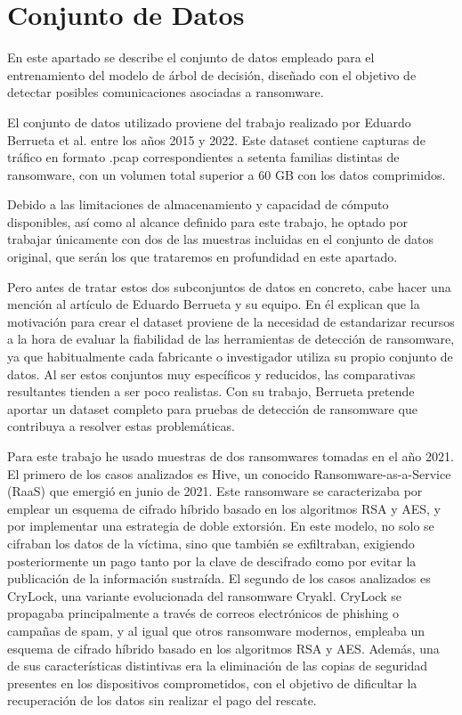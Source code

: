 \section{Conjunto de Datos}
En este apartado se describe el conjunto de datos empleado para el entrenamiento del modelo de árbol de decisión, diseñado con el objetivo de detectar posibles comunicaciones asociadas a ransomware.

El conjunto de datos utilizado proviene del trabajo realizado por Eduardo Berrueta et al. entre los años 2015 y 2022\cite{qnyn-q136-20}. Este dataset contiene capturas de tráfico en formato .pcap correspondientes a setenta familias distintas de ransomware, con un volumen total superior a 60 GB con los datos comprimidos.

Debido a las limitaciones de almacenamiento y capacidad de cómputo disponibles, así como al alcance definido para este trabajo, he optado por trabajar únicamente con dos de las muestras incluidas en el conjunto de datos original, que serán los que trataremos en profundidad en este apartado.

Pero antes de tratar estos dos subconjuntos de datos en concreto, cabe hacer una mención al artículo de Eduardo Berrueta y su equipo\cite{9050526}. En él explican que la motivación para crear el dataset proviene de la necesidad de estandarizar recursos a la hora de evaluar la fiabilidad de las herramientas de detección de ransomware, ya que habitualmente cada fabricante o investigador utiliza su propio conjunto de datos. Al ser estos conjuntos muy específicos y reducidos, las comparativas resultantes tienden a ser poco realistas. Con su trabajo, Berrueta pretende aportar un dataset completo para pruebas de detección de ransomware que contribuya a resolver estas problemáticas.

Para este trabajo he usado muestras de dos ransomwares tomadas en el año 2021. El primero de los casos analizados es Hive, un conocido Ransomware-as-a-Service (RaaS) que emergió en junio de 2021. Este ransomware se caracterizaba por emplear un esquema de cifrado híbrido basado en los algoritmos RSA y AES, y por implementar una estrategia de doble extorsión. En este modelo, no solo se cifraban los datos de la víctima, sino que también se exfiltraban, exigiendo posteriormente un pago tanto por la clave de descifrado como por evitar la publicación de la información sustraída\cite{KIM2022103387}. El segundo de los casos analizados es CryLock, una variante evolucionada del ransomware Cryakl. CryLock se propagaba principalmente a través de correos electrónicos de phishing o campañas de spam, y al igual que otros ransomware modernos, empleaba un esquema de cifrado híbrido basado en los algoritmos RSA y AES. Además, una de sus características distintivas era la eliminación de las copias de seguridad presentes en los dispositivos comprometidos, con el objetivo de dificultar la recuperación de los datos sin realizar el pago del rescate.\cite{HeimdalCryLock2022}

